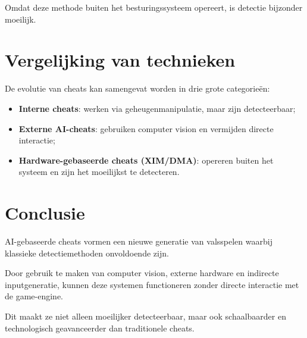 Omdat deze methode buiten het besturingssysteem opereert, is detectie bijzonder moeilijk.

\section{Vergelijking van technieken}

De evolutie van cheats kan samengevat worden in drie grote categorieën:

\begin{itemize}
    \item \textbf{Interne cheats}: werken via geheugenmanipulatie, maar zijn detecteerbaar;
    \item \textbf{Externe AI-cheats}: gebruiken computer vision en vermijden directe interactie;
    \item \textbf{Hardware-gebaseerde cheats (XIM/DMA)}: opereren buiten het systeem en zijn het moeilijkst te detecteren.
\end{itemize}

\section{Conclusie}

AI-gebaseerde cheats vormen een nieuwe generatie van valsspelen waarbij klassieke detectiemethoden onvoldoende zijn.

Door gebruik te maken van computer vision, externe hardware en indirecte inputgeneratie, kunnen deze systemen functioneren zonder directe interactie met de game-engine.

Dit maakt ze niet alleen moeilijker detecteerbaar, maar ook schaalbaarder en technologisch geavanceerder dan traditionele cheats.